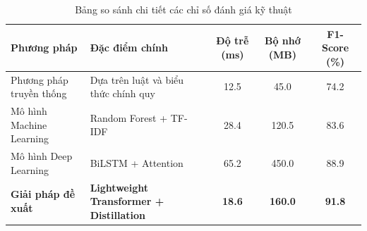 
\begin{table}[htbp]
\centering
\caption{Bảng so sánh chi tiết các chỉ số đánh giá kỹ thuật}
\label{tab:sample-comparison}
\begin{tabularx}{\textwidth}{lXccc}
\toprule
\textbf{Phương pháp} & \textbf{Đặc điểm chính} & \textbf{Độ trễ (ms)} & \textbf{Bộ nhớ (MB)} & \textbf{F1-Score (\%)} \\
\midrule
Phương pháp truyền thống & Dựa trên luật và biểu thức chính quy & 12.5 & 45.0 & 74.2 \\
Mô hình Machine Learning & Random Forest + TF-IDF & 28.4 & 120.5 & 83.6 \\
Mô hình Deep Learning   & BiLSTM + Attention & 65.2 & 450.0 & 88.9 \\
\textbf{Giải pháp đề xuất} & \textbf{Lightweight Transformer + Distillation} & \textbf{18.6} & \textbf{160.0} & \textbf{91.8} \\
\bottomrule
\end{tabularx}
\end{table}

